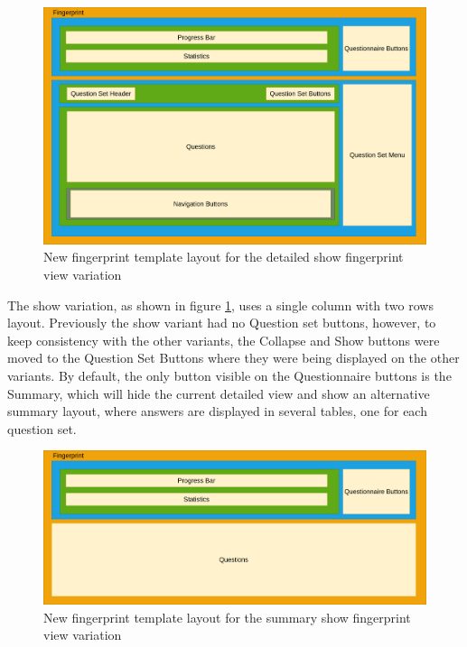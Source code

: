\begin{figure}[H]
    \center
    \includegraphics[width=\textwidth]{fingerprint-show-detailed-after-diagram}
    \caption{New fingerprint template layout for the detailed show fingerprint view variation}
    \label{fig:fingerprint-show-detailed-after-diagram}
\end{figure}

The show variation, as shown in figure \ref{fig:fingerprint-show-detailed-after-diagram}, uses a single column with two rows layout.
Previously the show variant had no Question set buttons, however, to keep consistency with the other variants, the Collapse and Show buttons were moved to the Question Set Buttons where they were being displayed on the other variants.
By default, the only button visible on the Questionnaire buttons is the Summary, which will hide the current detailed view and show an alternative summary layout, where answers are displayed in several tables, one for each question set.

\begin{figure}[H]
    \center
    \includegraphics[width=\textwidth]{fingerprint-show-summary-after-diagram}
    \caption{New fingerprint template layout for the summary show fingerprint view variation}
    \label{fig:fingerprint-show-summary-after-diagram}
\end{figure}

